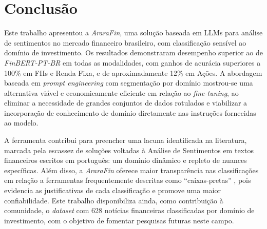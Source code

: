 \documentclass[12pt]{article}
\begin{document}





\section{Conclusão}

Este trabalho apresentou a \textit{AraraFin}, uma solução baseada em LLMs para análise de sentimentos no mercado financeiro brasileiro, com classificação sensível ao domínio de investimento. Os resultados demonstraram desempenho superior ao de \textit{FinBERT-PT-BR} em todas as modalidades, com ganhos de acurácia superiores a 
100\% em FIIs e Renda Fixa, e de aproximadamente 12\% em Ações. A abordagem baseada em \textit{prompt engineering} com segmentação por domínio mostrou-se uma alternativa 
viável e economicamente eficiente em relação ao \textit{fine-tuning}, ao eliminar a necessidade de grandes conjuntos de dados rotulados e viabilizar a incorporação de conhecimento de domínio diretamente nas instruções fornecidas ao modelo.

A ferramenta contribui para preencher uma lacuna identificada na literatura, marcada pela escassez de soluções voltadas à Análise de Sentimentos em textos financeiros escritos em português: um domínio dinâmico e repleto de nuances específicas. Além disso, a \textit{AraraFin} oferece maior transparência nas classificações em relação a ferramentas frequentemente descritas como “caixas-pretas” \cite{jim2024recent}, pois evidencia as justificativas de cada classificação e promove uma maior confiabilidade. Este trabalho
disponibiliza ainda, como contribuição à comunidade, o \textit{dataset} com 628 notícias financeiras classificadas por domínio de investimento, com o objetivo de fomentar pesquisas futuras neste campo.
\end{document}
